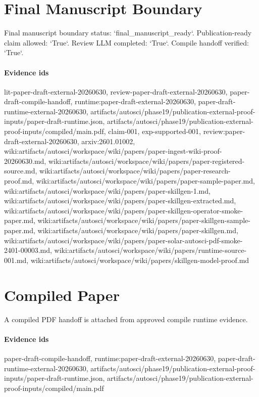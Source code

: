 \documentclass{article}
\begin{document}
\section{Final Manuscript Boundary}
Final manuscript boundary status: `final\_manuscript\_ready`. Publication-ready claim allowed: `True`. Review LLM completed: `True`. Compile handoff verified: `True`.

\paragraph{Evidence ids} lit-paper-draft-external-20260630, review-paper-draft-external-20260630, paper-draft-compile-handoff, runtime:paper-draft-external-20260630, paper-draft-runtime-external-20260630, artifacts/autosci/phase19/publication-external-proof-inputs/paper-draft-runtime.json, artifacts/autosci/phase19/publication-external-proof-inputs/compiled/main.pdf, claim-001, exp-supported-001, review:paper-draft-external-20260630, arxiv:2601.01002, wiki:artifacts/autosci/workspace/wiki/papers/paper-ingest-wiki-proof-20260630.md, wiki:artifacts/autosci/workspace/wiki/papers/paper-registered-source.md, wiki:artifacts/autosci/workspace/wiki/papers/paper-research-proof.md, wiki:artifacts/autosci/workspace/wiki/papers/paper-sample-paper.md, wiki:artifacts/autosci/workspace/wiki/papers/paper-skillgen-1.md, wiki:artifacts/autosci/workspace/wiki/papers/paper-skillgen-extracted.md, wiki:artifacts/autosci/workspace/wiki/papers/paper-skillgen-operator-smoke-paper.md, wiki:artifacts/autosci/workspace/wiki/papers/paper-skillgen-sample-paper.md, wiki:artifacts/autosci/workspace/wiki/papers/paper-skillgen.md, wiki:artifacts/autosci/workspace/wiki/papers/paper-solar-autosci-pdf-smoke-2401-00003.md, wiki:artifacts/autosci/workspace/wiki/papers/runtime-source-001.md, wiki:artifacts/autosci/workspace/wiki/papers/skillgen-model-proof.md

\section{Compiled Paper}
A compiled PDF handoff is attached from approved compile runtime evidence.

\paragraph{Evidence ids} paper-draft-compile-handoff, runtime:paper-draft-external-20260630, paper-draft-runtime-external-20260630, artifacts/autosci/phase19/publication-external-proof-inputs/paper-draft-runtime.json, artifacts/autosci/phase19/publication-external-proof-inputs/compiled/main.pdf
\end{document}
